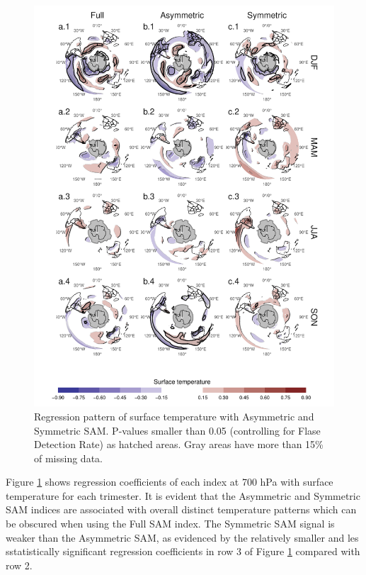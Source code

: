 \documentclass[]{ametsocV5}
\begin{document}
\begin{figure}
\includegraphics{regr-air-season-1} \caption[Regression pattern of surface temperature with Asymmetric and Symmetric SAM]{Regression pattern of surface temperature with Asymmetric and Symmetric SAM. P-values smaller than 0.05 (controlling for Flase Detection Rate) as hatched areas. Gray areas have more than 15\% of missing data.}\label{fig:regr-air-season}
\end{figure}

Figure \ref{fig:regr-air-season} shows regression coefficients of each
index at 700 hPa with surface temperature for each trimester. It is
evident that the Asymmetric and Symmetric SAM indices are associated
with overall distinct temperature patterns which can be obscured when
using the Full SAM index. The Symmetric SAM signal is weaker than the
Asymmetric SAM, as evidenced by the relatively smaller and les
sstatistically significant regression coefficients in row 3 of Figure
\ref{fig:regr-air-season} compared with row 2.
\end{document}
